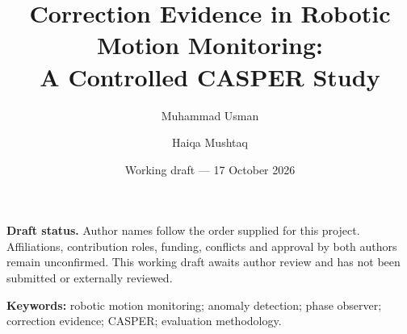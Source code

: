 \documentclass[11pt,a4paper]{article}
\title{Correction Evidence in Robotic Motion Monitoring:\\A Controlled CASPER Study}
\author{Muhammad Usman \and Haiqa Mushtaq}
\date{Working draft --- 17 October 2026}
\begin{document}
\maketitle
\noindent\textbf{Draft status.} Author names follow the order supplied for this project. Affiliations, contribution roles, funding, conflicts and approval by both authors remain unconfirmed. This working draft awaits author review and has not been submitted or externally reviewed.

\noindent\textbf{Keywords:} robotic motion monitoring; anomaly detection; phase observer; correction evidence; CASPER; evaluation methodology.









\clearpage
\appendix

\clearpage

\end{document}
